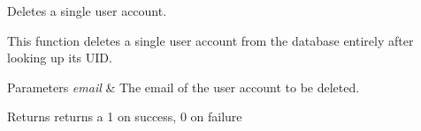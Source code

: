 Deletes a single user account. 

This function deletes a single user account from the database entirely after looking up its U\-I\-D. 
\begin{DoxyParams}{Parameters}
{\em email} & The email of the user account to be deleted. \\
\hline
\end{DoxyParams}
\begin{DoxyReturn}{Returns}
returns a 1 on success, 0 on failure 
\end{DoxyReturn}
